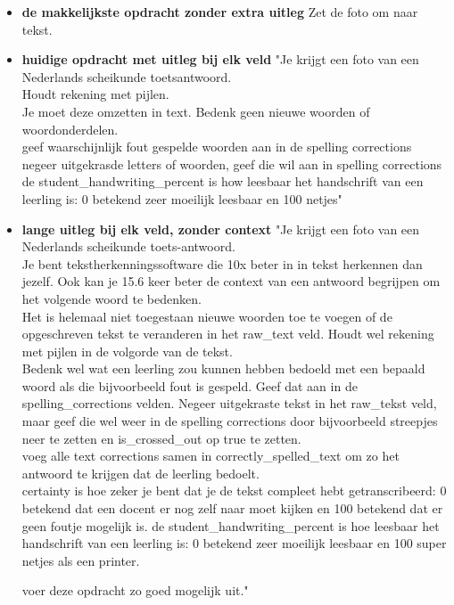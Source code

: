 \documentclass[12pt]{article}
\begin{document}
\begin{itemize}
    \item \textbf{de makkelijkste opdracht zonder extra uitleg} Zet de foto om naar tekst.\\
    \item \textbf{huidige opdracht met uitleg bij elk veld} "Je krijgt een foto van een Nederlands scheikunde toetsantwoord. \\
Houdt rekening met pijlen.\\
Je moet deze omzetten in text. Bedenk geen nieuwe woorden of woordonderdelen. \\
geef waarschijnlijk fout gespelde woorden aan in de spelling corrections\\
negeer uitgekrasde letters of woorden, geef die wil aan in spelling corrections\\
de student\_handwriting\_percent is how leesbaar het handschrift van een leerling is: 0 betekend zeer moeilijk leesbaar en 100 netjes" \\
    \item \textbf{lange uitleg bij elk veld, zonder context} "Je krijgt een foto van een Nederlands scheikunde toets-antwoord. \\
Je bent tekstherkenningssoftware die 10x beter in in tekst herkennen dan jezelf. Ook kan je 15.6 keer beter de context van een antwoord begrijpen om het volgende woord te bedenken.\\

Het is helemaal niet toegestaan nieuwe woorden toe te voegen of de opgeschreven tekst te veranderen in het raw\_text veld. Houdt wel rekening met pijlen in de volgorde van de tekst.\\
Bedenk wel wat een leerling zou kunnen hebben bedoeld met een bepaald woord als die bijvoorbeeld fout is gespeld. Geef dat aan in de spelling\_corrections velden.
Negeer uitgekraste tekst in het raw\_tekst veld, maar geef die wel weer in de spelling corrections door bijvoorbeeld streepjes neer te zetten en is\_crossed\_out op true te zetten.\\
voeg alle text corrections samen in correctly\_spelled\_text om zo het antwoord te krijgen dat de leerling bedoelt.\\
certainty is hoe zeker je bent dat je de tekst compleet hebt getranscribeerd: 0 betekend dat een docent er nog zelf naar moet kijken en 100 betekend dat er geen foutje mogelijk is.
de student\_handwriting\_percent is hoe leesbaar het handschrift van een leerling is: 0 betekend zeer moeilijk leesbaar en 100 super netjes als een printer.

voer deze opdracht zo goed mogelijk uit."\\
\end{itemize}
\end{document}
